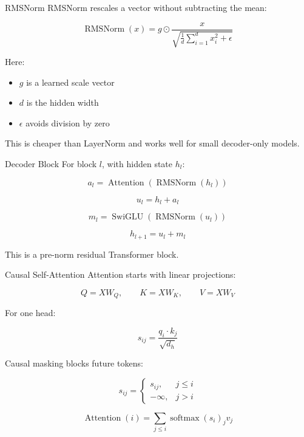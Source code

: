 \documentclass[aspectratio=169]{beamer}
\newcommand{\softmax}{\operatorname{softmax}}
\newcommand{\RMSNorm}{\operatorname{RMSNorm}}
\begin{document}
\begin{frame}{RMSNorm}
  RMSNorm rescales a vector without subtracting the mean:

  \[
    \RMSNorm(x)
    =
    g \odot
    \frac{x}{\sqrt{\frac{1}{d}\sum_{i=1}^{d}x_i^2 + \epsilon}}
  \]

  \vspace{0.5em}

  Here:

  \begin{itemize}
    \item \(g\) is a learned scale vector
    \item \(d\) is the hidden width
    \item \(\epsilon\) avoids division by zero
  \end{itemize}

  \vspace{0.5em}

  This is cheaper than LayerNorm and works well for small decoder-only models.
\end{frame}

\begin{frame}{Decoder Block}
  For block \(l\), with hidden state \(h_l\):

  \[
    a_l = \operatorname{Attention}(\RMSNorm(h_l))
  \]

  \[
    u_l = h_l + a_l
  \]

  \[
    m_l = \operatorname{SwiGLU}(\RMSNorm(u_l))
  \]

  \[
    h_{l+1} = u_l + m_l
  \]

  \vspace{0.5em}

  This is a pre-norm residual Transformer block.
\end{frame}

\begin{frame}{Causal Self-Attention}
  Attention starts with linear projections:

  \[
    Q = XW_Q,\qquad K = XW_K,\qquad V = XW_V
  \]

  For one head:

  \[
    s_{ij}
    =
    \frac{q_i \cdot k_j}{\sqrt{d_h}}
  \]

  Causal masking blocks future tokens:

  \[
    s_{ij} =
    \begin{cases}
      s_{ij}, & j \le i \\
      -\infty, & j > i
    \end{cases}
  \]

  \[
    \operatorname{Attention}(i)
    =
    \sum_{j \le i}
    \softmax(s_i)_j v_j
  \]
\end{frame}
\end{document}

